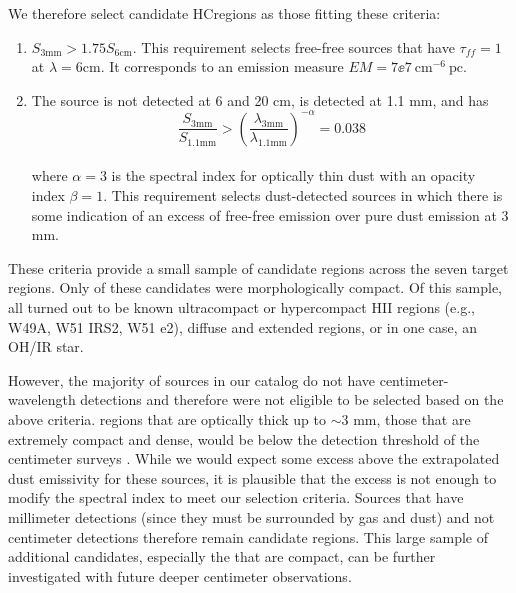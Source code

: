 \documentclass[twocolumn]{aastex62}
\begin{document}
We therefore select candidate HC\hii regions
as those fitting these criteria:
\begin{enumerate}
    \item $S_{3 \mathrm{mm}} > 1.75 S_{6 \mathrm{cm}}$.  %
        This requirement selects free-free sources that have $\tau_{ff}=1$
        at $\lambda = {6 \mathrm{cm}}$.  It corresponds to an emission
        measure ${EM=7\ee{7}~\mathrm{cm}^{-6}~\mathrm{pc}}$.
    \item
        The source is not detected at 6 and 20 cm, is detected at 1.1 mm, and has
        \begin{equation}
            \frac{S_{3 \mathrm{mm}}}{S_{1.1 \mathrm{mm}}} > \left(\frac{\lambda_{3 \mathrm{mm}}}
            {\lambda_{1.1 \mathrm{mm}}}\right)^{-\alpha} = 0.038
        \end{equation}\\
        where $\alpha=3$ is the spectral
        index for optically thin dust with an opacity index $\beta=1$.  This
        requirement selects dust-detected sources in which there is some
        indication of an excess of free-free emission over pure dust emission
        at 3 mm.
\end{enumerate}

These criteria provide a small sample of \nhiicand candidate \hchii regions
across the seven target regions.  Only \ncompacthiicand of these candidates
were morphologically compact. Of this sample, all turned out to be known
ultracompact or hypercompact HII regions (e.g., W49A, W51 IRS2, W51 e2),
diffuse and extended regions, or in one case, an OH/IR star. 

However, the majority of sources in our catalog do not have
centimeter-wavelength detections and therefore were not
eligible to be selected based on the above criteria.  \hchii regions that are optically
thick up to $\sim3$ mm, those that are extremely compact and dense,
would be below the detection threshold of the centimeter surveys
\citep[$\approx2.5$ mJy at 6 cm;][]{Giveon2005a,Hoare2012a}.  While we would
expect some excess above the extrapolated dust emissivity for these sources,
it is plausible that the excess is not enough to modify the spectral index
to meet our selection criteria.  Sources that have millimeter detections (since
they must be surrounded by gas and dust) and not centimeter detections
therefore remain candidate \hchii regions.  This large sample of
\mmdetectionscmnondetections additional candidates, especially the
\mmdetectionscmnondetectionscompact that are compact, can be further investigated
with future deeper centimeter observations.
\end{document}

